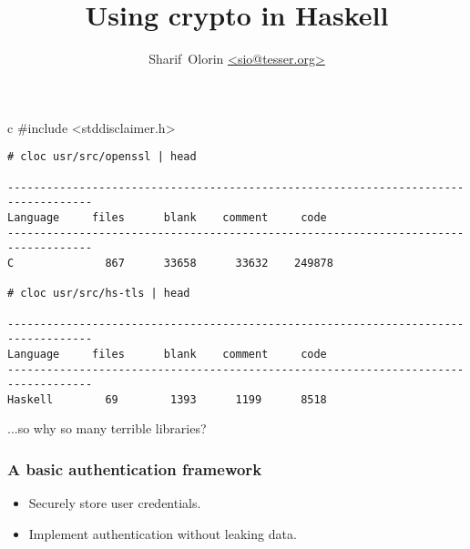 \documentclass{beamer}
\title{Using crypto in Haskell}
\author{Sharif~Olorin \url{<sio@tesser.org>}}
\institute{Ambiata}
\begin{document}
\frame{\titlepage}

\begin{frame}[fragile]

\centering
\begin{cminted}[mathescape]{c}
#include <stddisclaimer.h>
\end{cminted}

\end{frame}

\begin{frame}[fragile]

\begin{verbatim}
# cloc usr/src/openssl | head                                                                                                                  
                                                                                                                                            -----------------------------------------------------------------------------------
Language     files      blank    comment     code
-----------------------------------------------------------------------------------
C              867      33658      33632    249878

# cloc usr/src/hs-tls | head                                                                                                                  
                                                                                                                                            -----------------------------------------------------------------------------------
Language     files      blank    comment     code
-----------------------------------------------------------------------------------
Haskell        69        1393      1199      8518
\end{verbatim}


\end{frame}

\begin{frame}

\center
...so why so many terrible libraries?
\end{frame}

\begin{frame}
\frametitle{A basic authentication framework}

\begin{itemize}
\item Securely store user credentials.
\item Implement authentication without leaking data.
\end{itemize}

\end{frame}
\end{document}
